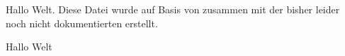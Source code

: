 \documentclass{application-maverick}
\begin{document}
    \begin{ap-page}

        Hallo Welt. Diese Datei wurde auf Basis von  zusammen mit der bisher leider noch nicht dokumentierten  erstellt.
    \end{ap-page}

    \begin{ap-page*}
        \blinddocument
    \end{ap-page*}

    \begin{ap-page}

        Hallo Welt
    \end{ap-page}
\end{document}
